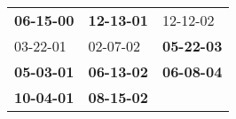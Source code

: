 \begin{supertabular}{p{0.33\columnwidth}p{0.33\columnwidth}p{0.33\columnwidth}}
 \textbf{06-15-00\textsuperscript{}} &  \textbf{12-13-01\textsuperscript{}} &           12-12-02\textsuperscript{} \\
          03-22-01\textsuperscript{} &           02-07-02\textsuperscript{} &  \textbf{05-22-03\textsuperscript{}} \\
 \textbf{05-03-01\textsuperscript{}} &  \textbf{06-13-02\textsuperscript{}} &  \textbf{06-08-04\textsuperscript{}} \\
 \textbf{10-04-01\textsuperscript{}} &  \textbf{08-15-02\textsuperscript{}} &                                      \\
\end{supertabular}
